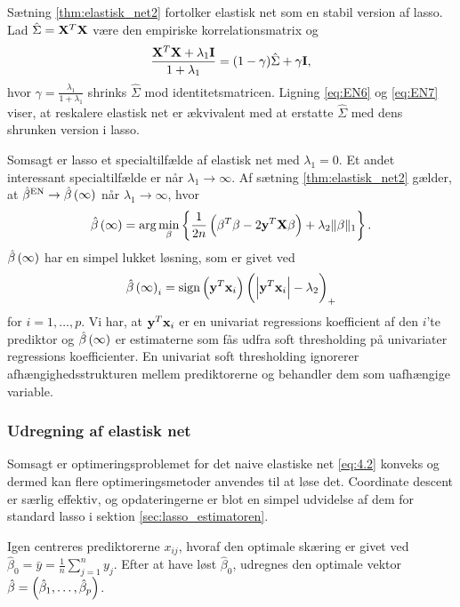 %
Sætning \ref{thm:elastisk_net2} fortolker elastisk net som en stabil version af lasso.
Lad \(\hat{\Sigma} = \mathbf{X}^T \mathbf{X}\) være den empiriske korrelationsmatrix og
\begin{align*}
\frac{\mathbf{X}^T \mathbf{X} + \lambda_1 \mathbf{I}}{1 + \lambda_1} = (1-\gamma) \hat{\Sigma} + \gamma \mathbf{I},
\end{align*}
hvor \(\gamma=\frac{\lambda_1}{1+\lambda_1}\) shrinks \(\hat{\Sigma}\) mod identitetsmatricen.
Ligning \eqref{eq:EN6} og \eqref{eq:EN7} viser, at reskalere elastisk net er ækvivalent med at erstatte \(\hat{\Sigma}\) med dens shrunken version i lasso.


Somsagt er lasso et specialtilfælde af elastisk net med \(\lambda_1=0\). 
Et andet interessant specialtilfælde er når \(\lambda_1 \rightarrow \infty\).
Af sætning \ref{thm:elastisk_net2} gælder, at \(\hat{\beta}^\text{EN} \rightarrow \hat{\beta} \del{\infty}\) når \(\lambda_1 \rightarrow \infty\), hvor
\begin{align*}
\hat{\beta} \del{\infty} = \arg \min_\beta \cbr{\frac{1}{2n} \del{\beta^T \beta - 2 \y^T \X \beta} + \lambda_2 \Vert \beta \Vert_1}.
\end{align*}
\(\hat{\beta} \del{\infty}\) har en simpel lukket løsning, som er givet ved
\begin{align*}
\hat{\beta} \del{\infty}_i = \text{sign} \del{\y^T \mathbf{x}_i} \del{\left\vert \y^T \mathbf{x}_i \right\vert - \lambda_2}_+
\end{align*}
for \(i = 1, \ldots, p\).
Vi har, at \(\mathbf{y}^T \mathbf{x}_i\) er en univariat regressions koefficient af den \(i\)'te prediktor og \(\hat{\beta} \del{\infty}\) er estimaterne som fås udfra soft thresholding på univariater regressions koefficienter.
En univariat soft thresholding ignorerer afhængighedsstrukturen mellem prediktorerne og behandler dem som uafhængige variable.

\subsubsection{Udregning af elastisk net}
Somsagt er optimeringsproblemet for det naive elastiske net \eqref{eq:4.2} konveks og dermed kan flere optimeringsmetoder anvendes til at løse det.
Coordinate descent er særlig effektiv, og opdateringerne er blot en simpel udvidelse af dem for standard lasso i sektion \ref{sec:lasso_estimatoren}.

Igen centreres prediktorerne \(x_{ij}\), hvoraf den optimale skæring er givet ved \(\hat{\beta}_0=\bar{y}=\frac{1}{n} \sum_{j=1}^n y_j\).
Efter at have løst \(\hat{\beta}_0\), udregnes den optimale vektor \(\hat{\beta}= \del{\hat{\beta}_1, \ldots, \hat{\beta}_p}\).

